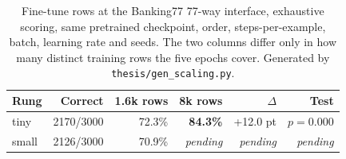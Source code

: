 \begin{table}[htbp]
\centering
\caption{Fine-tune rows at the Banking77 77-way interface, exhaustive scoring,
same pretrained checkpoint, order, steps-per-example, batch, learning rate and
seeds. The two columns differ only in how many distinct training rows the five
epochs cover. Generated by \texttt{thesis/gen\_scaling.py}.}
\label{tab:rows}
\setlength{\tabcolsep}{4pt}
\begin{tabular}{lrrrrr}
\toprule
Rung & Correct & 1.6k rows & 8k rows & $\Delta$ & Test \\
\midrule
tiny & 2170/3000 & 72.3\% & \textbf{84.3\%} & +12.0 pt & $p=0.000$ \\
small & 2126/3000 & 70.9\% & \emph{pending} & \emph{pending} & \emph{pending} \\
\bottomrule
\end{tabular}
\end{table}
